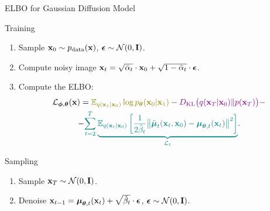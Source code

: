 \documentclass{beamer}
\begin{document}
\begin{frame}{ELBO for Gaussian Diffusion Model}
    \begin{block}{Training}
        \begin{enumerate}
            \item Sample $\mathbf{x}_0 \sim p_{\text{data}}(\mathbf{x})$, $\boldsymbol{\epsilon} \sim \mathcal{N}(0, \mathbf{I})$.
            \item Compute noisy image $\mathbf{x}_t = \sqrt{\bar{\alpha}_t} \cdot \mathbf{x}_0 + \sqrt{1 - \bar{\alpha}_t} \cdot \boldsymbol{\epsilon}$.
            \item Compute the ELBO:
            \vspace{-0.3cm}
            \begin{multline*}
                \cL_{\bphi, \btheta}(\bx) =  {\color{olive}\bbE_{q(\bx_1 | \bx_0)} \log \pt(\bx_0 | \bx_1)} - {\color{violet}\KL\bigl(q(\bx_T | \bx_0) \| p(\bx_T)\bigr)} - \\
                - {\color{teal}\sum_{t=2}^T \underbrace{ \bbE_{q(\bx_t | \bx_0)} \left[\frac{1}{2\tilde{\beta}_t} \bigl\| \tilde{\bmu}_t(\bx_t, \bx_0) - \bmu_{\btheta, t}(\bx_t) \bigr\|^2  \right]}_{\cL_t}}.
            \end{multline*}
            \vspace{-0.5cm}
        \end{enumerate}
    \end{block}
    \eqpause
    \begin{block}{Sampling}
        \begin{enumerate}
            \item Sample $\mathbf{x}_T \sim \mathcal{N}(0, \mathbf{I})$.
            \item Denoise $\mathbf{x}_{t - 1} = \boldsymbol{\mu}_{\boldsymbol{\theta}, t}(\mathbf{x}_t) +  \sqrt{\tilde{\beta}_t} \cdot \boldsymbol{\epsilon}$, $\boldsymbol{\epsilon} \sim \mathcal{N}(0, \mathbf{I})$.
        \end{enumerate}
    \end{block}
\end{frame}
\end{document}
